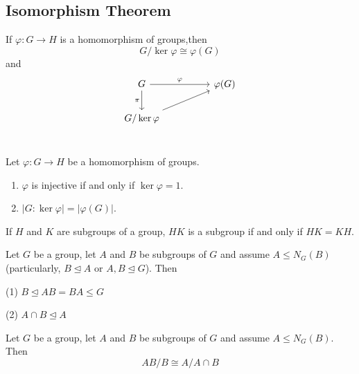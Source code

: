 \subsection{Isomorphism Theorem}

\begin{theorem}
    If $\varphi: G \rightarrow H$ is a homomorphism of groups,then
    \begin{equation*}
        G / \operatorname{ker} \varphi \cong \varphi(G)
    \end{equation*}
    and
    \begin{equation*}
        \begin{tikzcd}
            G \arrow[d, "\pi"'] \arrow[rr, "\varphi"] &  & \varphi (G) \\
            G/\ker \varphi \arrow[rru]             &  &    \\
        \end{tikzcd}
    \end{equation*}

\end{theorem}
\begin{corollary}
    Let $\varphi: G \rightarrow H$ be a homomorphism of groups.
    \begin{enumerate}
        \item
              $\varphi$ is injective if and only if $\operatorname{ker} \varphi=1$.

        \item
              $|G: \operatorname{ker} \varphi|=|\varphi(G)|$.
    \end{enumerate}
\end{corollary}


\begin{proposition}
    If $H$ and $K$ are subgroups of a group, $H K$ is a subgroup if and only if $H K=K H$.
\end{proposition}
\begin{proposition}
    Let $G$ be a group, let $A$ and $B$ be subgroups of $G$ and assume $A \leq N_G(B) $(particularly, $B \unlhd A$ or $A,B\unlhd G$). Then

    (1) $B \unlhd AB =BA \leq G$

    (2) $A\cap B \unlhd A$
\end{proposition}
\begin{theorem}
    Let $G$ be a group, let $A$ and $B$ be subgroups of $G$ and assume $A \leq N_G(B)$. Then
    \[
        AB/B \cong A/ A\cap B
    \]
\end{theorem}


